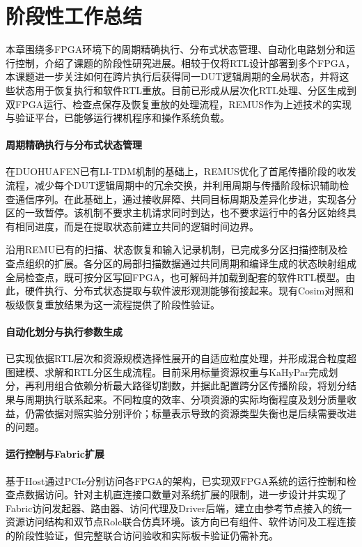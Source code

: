 \section{阶段性工作总结}
\label{sec:midterm-summary}

本章围绕多FPGA环境下的周期精确执行、分布式状态管理、自动化电路划分和运行控制，介绍了课题的阶段性研究进展。相较于仅将RTL设计部署到多个FPGA，本课题进一步关注如何在跨片执行后获得同一DUT逻辑周期的全局状态，并将这些状态用于恢复执行和软件RTL重放。目前已形成从层次化RTL处理、分区生成到双FPGA运行、检查点保存及恢复重放的处理流程，REMUS作为上述技术的实现与验证平台，已能够运行裸机程序和操作系统负载。

\paragraph{周期精确执行与分布式状态管理}

在DUOHUAFEN已有LI-TDM机制的基础上，REMUS优化了首尾传播阶段的收发流程，减少每个DUT逻辑周期中的冗余交换，并利用周期与传播阶段标识辅助检查通信序列。在此基础上，通过接收屏障、共同目标周期及差异化步进，实现各分区的一致暂停。该机制不要求主机请求同时到达，也不要求运行中的各分区始终具有相同进度，而是在提取状态前建立共同的逻辑时间边界。

沿用REMU已有的扫描、状态恢复和输入记录机制，已完成多分区扫描控制及检查点组织的扩展。各分区的局部扫描数据通过共同周期和编译生成的状态映射组成全局检查点，既可按分区写回FPGA，也可解码并加载到配套的软件RTL模型。由此，硬件执行、分布式状态提取与软件波形观测能够衔接起来。现有Cosim对照和板级恢复重放结果为这一流程提供了阶段性验证。

\paragraph{自动化划分与执行参数生成}

已实现依据RTL层次和资源规模选择性展开的自适应粒度处理，并形成混合粒度超图建模、求解和RTL分区生成流程。目前采用标量资源权重与KaHyPar完成划分，再利用组合依赖分析最大路径切割数，并据此配置跨分区传播阶段，将划分结果与周期执行联系起来。不同粒度的效率、分项资源的实际均衡程度及划分质量收益，仍需依据对照实验分别评价；标量表示导致的资源类型失衡也是后续需要改进的问题。

\paragraph{运行控制与Fabric扩展}

基于Host通过PCIe分别访问各FPGA的架构，已实现双FPGA系统的运行控制和检查点数据访问。针对主机直连接口数量对系统扩展的限制，进一步设计并实现了Fabric访问发起器、路由器、访问代理及Driver后端，建立由参考节点接入的统一资源访问结构和双节点Role联合仿真环境。该方向已有组件、软件访问及工程连接的阶段性验证，但完整联合访问验收和实际板卡验证仍需补充。

